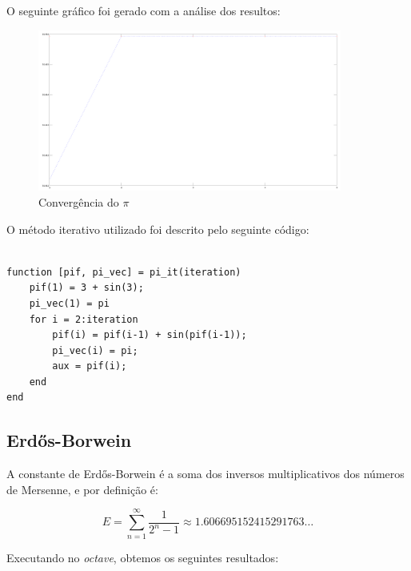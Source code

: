 \documentclass[a4paper]{article}
\begin{document}
O seguinte gráfico foi gerado com a análise dos resultos:

\begin{figure}[H]
    \centering
    \includegraphics[width=100mm]{pi_magic.png}
    \caption{Convergência do $\pi$}
    \label{pi_magic}
\end{figure}

O método iterativo utilizado foi descrito pelo seguinte código:

\begin{lstlisting}

function [pif, pi_vec] = pi_it(iteration)
	pif(1) = 3 + sin(3);
	pi_vec(1) = pi
	for i = 2:iteration
		pif(i) = pif(i-1) + sin(pif(i-1));
		pi_vec(i) = pi;
		aux = pif(i);
	end
end

\end{lstlisting}

\subsection{Erdős-Borwein}

A constante de Erdős-Borwein é a soma dos inversos multiplicativos dos números
de Mersenne, e por definição é:

\begin{equation}
	E = \displaystyle\sum_{n=1}^{\infty} \frac{1}{2^n-1} \approx 1.606695152415291763\dots
\end{equation}

Executando no \emph{octave}, obtemos os seguintes resultados:
\end{document}
